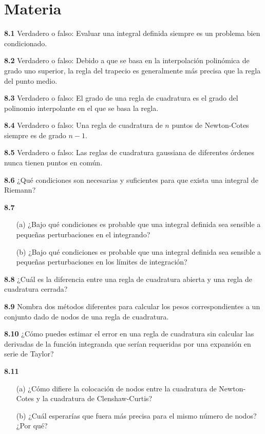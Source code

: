 \documentclass{article}
\begin{document}
\section{Materia}
\textbf{8.1} Verdadero o falso: Evaluar una integral definida siempre es un problema bien condicionado.

\textbf{8.2} Verdadero o falso: Debido a que se basa en la interpolación polinómica de grado uno superior, la regla del trapecio es generalmente más precisa que la regla del punto medio.

\textbf{8.3} Verdadero o falso: El grado de una regla de cuadratura es el grado del polinomio interpolante en el que se basa la regla.

\textbf{8.4} Verdadero o falso: Una regla de cuadratura de \(n\) puntos de Newton-Cotes siempre es de grado \(n - 1\).

\textbf{8.5} Verdadero o falso: Las reglas de cuadratura gaussiana de diferentes órdenes nunca tienen puntos en común.

\textbf{8.6} ¿Qué condiciones son necesarias y suficientes para que exista una integral de Riemann?

\textbf{8.7}
\begin{itemize}
    \item[(a)] ¿Bajo qué condiciones es probable que una integral definida sea sensible a pequeñas perturbaciones en el integrando?
    \item[(b)] ¿Bajo qué condiciones es probable que una integral definida sea sensible a pequeñas perturbaciones en los límites de integración?
\end{itemize}

\textbf{8.8} ¿Cuál es la diferencia entre una regla de cuadratura abierta y una regla de cuadratura cerrada?

\textbf{8.9} Nombra dos métodos diferentes para calcular los pesos correspondientes a un conjunto dado de nodos de una regla de cuadratura.

\textbf{8.10} ¿Cómo puedes estimar el error en una regla de cuadratura sin calcular las derivadas de la función integranda que serían requeridas por una expansión en serie de Taylor?

\textbf{8.11}
\begin{itemize}
    \item[(a)] ¿Cómo difiere la colocación de nodos entre la cuadratura de Newton-Cotes y la cuadratura de Clenshaw-Curtis?
    \item[(b)] ¿Cuál esperarías que fuera más precisa para el mismo número de nodos? ¿Por qué?
\end{itemize}
\end{document}
